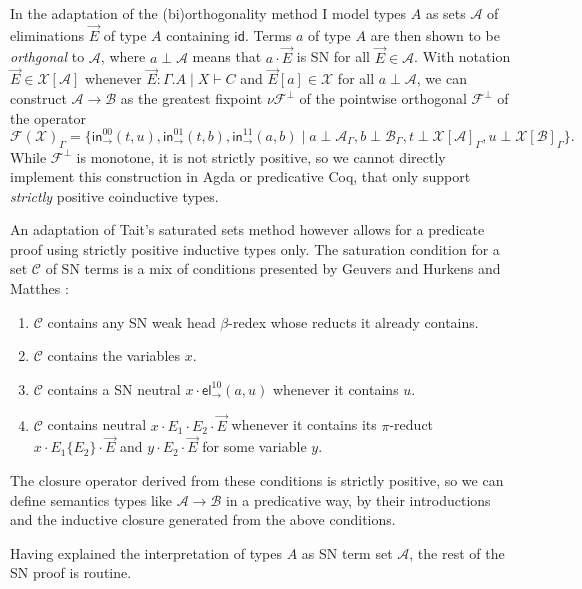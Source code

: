 \documentclass[a4paper]{easychair}
\providecommand{\tightlist}{%
  \setlength{\itemsep}{0pt}\setlength{\parskip}{0pt}}
\newcommand{\tid}{\mathsf{id}}
\newcommand{\tin}{\ensuremath{\mathsf{in}}}
\newcommand{\inn}[2]{\ensuremath{\tin_{#1}^{#2}}}
\newcommand{\tel}{\mathsf{el}}
\newcommand{\el}[2]{\ensuremath{\tel_{#1}^{#2}}}
\newcommand{\A}{\mathcal{A}}
\newcommand{\B}{\mathcal{B}}
\newcommand{\C}{\mathcal{C}}
\newcommand{\F}{\mathcal{F}}
\newcommand{\X}{\mathcal{X}}
\begin{document}
In the adaptation of the (bi)orthogonality method I model types $A$ as
sets $\A$ of eliminations $\vec E$ of type $A$ containing $\tid$.
Terms $a$ of type $A$ are then shown to be \emph{orthgonal} to $\A$,
where $a \perp \A$ means that $a \cdot \vec E$ is SN for all $\vec E
\in \A$.  With notation $\vec E \in \X[\A]$ whenever $\vec E : \Gamma.A
\mid X \vdash C$ and $\vec E[a] \in \X$ for all $a \perp \A$, we can
construct $\A \to \B$ as the greatest fixpoint $\nu \F^\perp$ of the
pointwise orthogonal $\F^\perp$ of the operator
\[
  \F(\X)_\Gamma =
  \{
    \inn\to{00}(t,u),
    \inn\to{01}(t,b),
    \inn\to{11}(a,b) \mid
      a \perp \A_\Gamma,
      b \perp \B_\Gamma,
      t \perp \X[\A]_\Gamma,
      u \perp \X[\B]_\Gamma
  \}
  .
\]
While $\F^\perp$ is monotone, it is not strictly positive, so we
cannot directly implement this construction in Agda or predicative
Coq, that only support \emph{strictly} positive coinductive types.

An adaptation of Tait's saturated sets method however allows for a
predicate proof using strictly positive inductive types only.  The
saturation condition for a set $\C$ of SN terms
is a mix of conditions presented by Geuvers and
Hurkens \citeyearpar{geuversHurkens:types17,geuversHurkens:addendumTypes17} and Matthes
\citeyearpar{matthes:classlog}:
\begin{enumerate}
\tightlist
\item $\C$ contains any SN weak head $\beta$-redex whose reducts it
  already contains.
\item $\C$ contains the variables $x$.
\item $\C$ contains a SN neutral $x \cdot \el\to{10}(a,u)$ whenever it
  contains $u$.
\item $\C$ contains neutral $x \cdot E_1 \cdot E_2 \cdot \vec E$
  whenever it contains its $\pi$-reduct $x \cdot E_1\{E_2\} \cdot \vec
  E$ and $y \cdot E_2 \cdot \vec E$ for some variable $y$.
\end{enumerate}
The closure operator derived from these conditions is strictly
positive, so we can define semantics types like $\A \to \B$
in a predicative way, by
their introductions and the inductive closure generated from the
above conditions.

Having explained the interpretation of types $A$ as SN term set $\A$,
the rest of the SN proof is routine.






%


\end{document}
